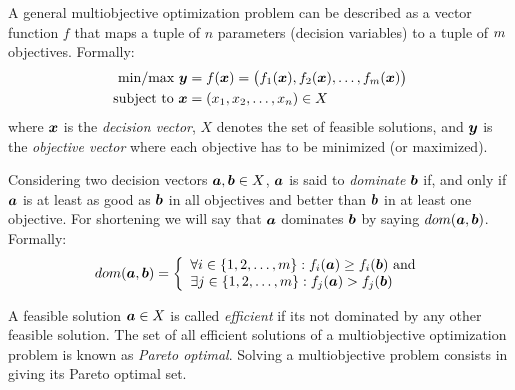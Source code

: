 A general multiobjective optimization problem can be described as a vector
function $f$ that maps a tuple of $n$ parameters (decision variables) to a tuple
of $m$ objectives.
Formally:
\begin{align*}
  \text{min/max} ~ \boldsymbol{y} &= f(\boldsymbol{x}) = 
    \big(f_1(\boldsymbol{x})
    ,f_2(\boldsymbol{x})
    ,\ldots
    ,f_{m}(\boldsymbol{x})\big) \\
  \text{subject to} ~ \boldsymbol{x} & = (x_1, x_2, \ldots, x_n) \in X
\end{align*}
where $\boldsymbol{x}$ is the \emph{decision vector}, $X$ denotes the set
of feasible solutions, and $\boldsymbol{y}$ is the \emph{objective vector} where
each objective has to be minimized (or maximized).

Considering two decision vectors $\boldsymbol{a}, \boldsymbol{b} \in X$, $\boldsymbol{a}$ is said to
\emph{dominate} $\boldsymbol{b}$ if, and only if $\boldsymbol{a}$ is at least as good as $\boldsymbol{b}$
in all objectives and better than $\boldsymbol{b}$ in at least one objective.
For shortening we will say that $\boldsymbol{a}$ dominates $\boldsymbol{b}$ by saying $dom(\boldsymbol{a}, \boldsymbol{b})$.
Formally:
\begin{displaymath}
    dom(\boldsymbol{a}, \boldsymbol{b}) = \left\{
      \begin{array}{l}
          \forall i \in \{1, 2, \ldots, m\}: f_i(\boldsymbol{a}) \geq f_i(\boldsymbol{b}) ~\text{and}\\
          \exists j \in \{1, 2, \ldots, m\}: f_j(\boldsymbol{a}) > f_j(\boldsymbol{b})
  \end{array} \right.
\end{displaymath}

A feasible solution $\boldsymbol{a} \in X$ is called \emph{efficient} %
if its not dominated by any other feasible solution.
The set of all efficient solutions of a multiobjective optimization problem is
known as \emph{Pareto optimal}.
Solving a multiobjective problem consists in giving its Pareto optimal set.

